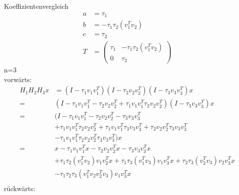 Koeffizientenvergleich
\begin{align*}
a &= \tau_1 \\
b &=-  \tau_1 \tau_2 (v_1^T v_2) \\
c &= \tau_2 \\
T &=
\begin{pmatrix}
\tau_1 & - \tau_1 \tau_2 (v_1^T v_2)\\ 0 & \tau_2
\end{pmatrix}
\end{align*}
\newpage
n=3\\
vorwärts: \\
\begin{align*}
	H_1 H_2 H_3 x &= (I-\tau_1 v_1 v_1^T)(I-\tau_2 v_2 v_2^T)(I-\tau_3 v_3 v_3^T)x\\
	= &(I - \tau_1 v_1 v_1^T - \tau_2 v_2 v_2^T +  \tau_1 v_1 v_1^T \tau_2 v_2 v_2^T )(I-\tau_3 v_3 v_3^T)x\\
	= &(I - \tau_1 v_1 v_1^T - \tau_2 v_2 v_2^T - \tau_3 v_3 v_3^T \\
	&+ \tau_1 v_1 v_1^T \tau_2 v_2 v_2^T 
	+ \tau_1 v_1 v_1^T \tau_3 v_3 v_3^T
	+ \tau_2 v_2 v_2^T \tau_3 v_3 v_3^T\\
	&- \tau_1 v_1 v_1^T \tau_2 v_2 v_2^T \tau_3 v_3 v_3^T )x \\
	= &x - \tau_1 v_1 v_1^Tx - \tau_2 v_2 v_2^Tx - \tau_3 v_3 v_3^Tx \\
    &+ \tau_1 \tau_2  (v_1^T v_2) v_1  v_2^T x
	+ \tau_1 \tau_3  (v_1^T v_3) v_1  v_3^T x
	+ \tau_2 \tau_3  (v_2^T v_3) v_2  v_3^T x\\
    &- \tau_1 \tau_2  \tau_3 (v_1^T v_2 v_2^T v_3) v_1  v_3^T x \\
\end{align*}
rückwärts:\\
